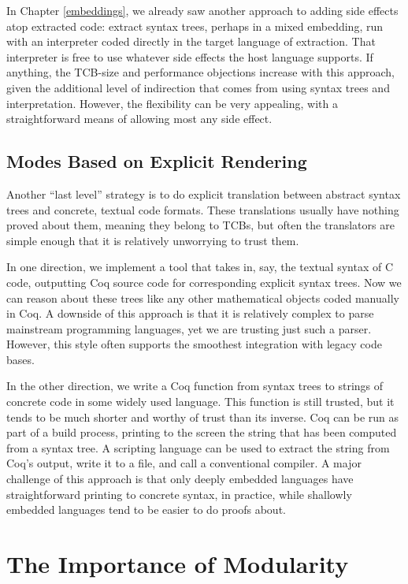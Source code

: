 \documentclass{amsbook}
\theoremstyle{definition}
\theoremstyle{remark}
\numberwithin{section}{chapter}
\numberwithin{equation}{chapter}
\begin{document}
In Chapter \ref{embeddings}, we already saw another approach to adding side effects atop extracted code: extract syntax trees, perhaps in a mixed embedding, run with an interpreter coded directly in the target language of extraction.
That interpreter is free to use whatever side effects the host language supports.
If anything, the TCB-size and performance objections increase with this approach, given the additional level of indirection that comes from using syntax trees and interpretation.
However, the flexibility can be very appealing, with a straightforward means of allowing most any side effect.

\subsection{Modes Based on Explicit Rendering}

Another ``last level'' strategy is to do explicit translation between abstract syntax trees and concrete, textual code formats.
These translations usually have nothing proved about them, meaning they belong to TCBs, but often the translators are simple enough that it is relatively unworrying to trust them.

In one direction, we implement a tool that takes in, say, the textual syntax of C code, outputting Coq source code for corresponding explicit syntax trees.
Now we can reason about these trees like any other mathematical objects coded manually in Coq.
A downside of this approach is that it is relatively complex to parse mainstream programming languages, yet we are trusting just such a parser.
However, this style often supports the smoothest integration with legacy code bases.

In the other direction, we write a Coq function from syntax trees to strings of concrete code in some widely used language.
This function is still trusted, but it tends to be much shorter and worthy of trust than its inverse.
Coq can be run as part of a build process, printing to the screen the string that has been computed from a syntax tree.
A scripting language can be used to extract the string from Coq's output, write it to a file, and call a conventional compiler.
A major challenge of this approach is that only deeply embedded languages have straightforward printing to concrete syntax, in practice, while shallowly embedded languages tend to be easier to do proofs about.


\section{The Importance of Modularity}
\end{document}
